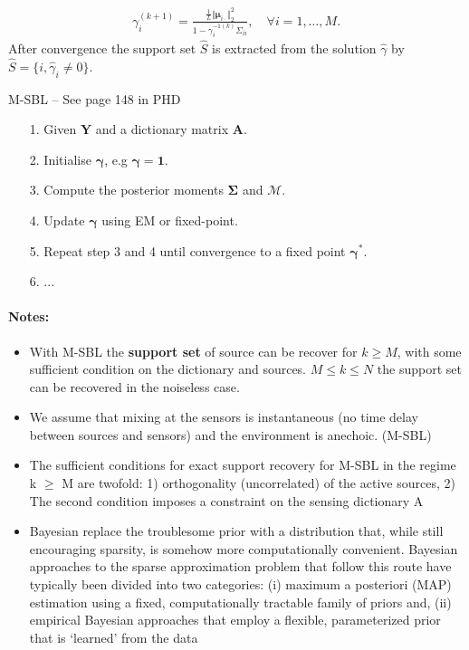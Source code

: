 \begin{align*}
\gamma_i^{(k+1)} = \frac{\frac{1}{L} \Vert \boldsymbol{\mu}_{i \cdot} \Vert_2^2}{1 - \gamma_i^{-1 (k)} \Sigma_{ii}}, \quad \forall i = 1, \dots, M.
\end{align*}
After convergence the support set $\hat{S}$ is extracted from the solution $\hat{\gamma}$ by $\hat{S} = \{ i, \hat{\gamma}_i \neq 0 \}$.


\begin{algorithm}[H]
\caption{M-SBL -- See page 148 in PHD}
\begin{itemize}
\item[1.] Given $\mathbf{Y}$ and a dictionary matrix $\mathbf{A}$.
\item[2.] Initialise $\boldsymbol{\gamma}$, e.g $\boldsymbol{\gamma} = \mathbf{1}$.
\item[3.] Compute the posterior moments $\boldsymbol{\Sigma}$ and $\mathcal{M}$.
\item[4.] Update $\boldsymbol{\gamma}$ using EM or fixed-point.
\item[5.] Repeat step 3 and 4 until convergence to a fixed point $\boldsymbol{\gamma}^\ast$.
\item[6.] ...
\end{itemize}
\end{algorithm}

\paragraph{Notes:}
\begin{itemize}
\item With M-SBL the \textbf{support set} of source can be recover for $k \geq M$, with some sufficient condition on the dictionary and sources. $M \leq k \leq N$ the support set can be recovered in the noiseless case.
\item We assume that mixing at the sensors is instantaneous (no time delay between sources and sensors) and the environment is anechoic. (M-SBL)
\item The sufficient conditions for exact support recovery for M-SBL in the regime k $\geq$ M are twofold: 1) orthogonality (uncorrelated) of the active sources, 2) The second condition imposes a constraint on the sensing dictionary A
\item Bayesian replace the troublesome prior with a distribution that, while still encouraging sparsity, is somehow more computationally convenient. Bayesian approaches to the sparse approximation problem that follow this route have typically been divided into two categories: (i) maximum a posteriori (MAP) estimation using a fixed, computationally tractable family of priors and, (ii) empirical Bayesian approaches that employ a flexible, parameterized prior that is ‘learned’ from the data
\end{itemize}